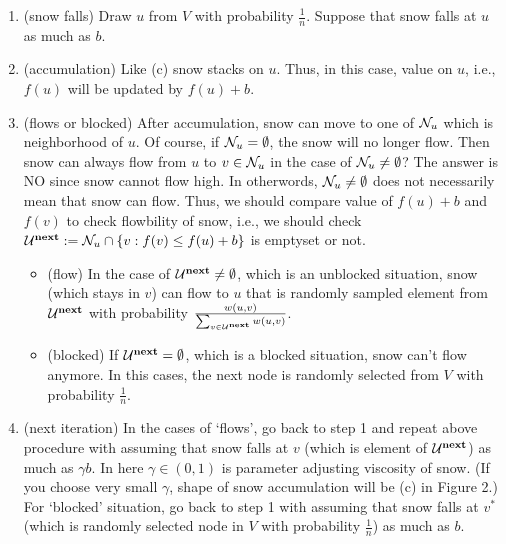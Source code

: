 \documentclass[preprint, review, 12pt]{article}
\theoremstyle{definition}
\theoremstyle{remark}
\begin{document}
\begin{enumerate}[1.]
\item (snow falls) Draw $u$ from $V$ with probability $\frac{1}{n}$. Suppose that snow falls at $u$ as much as $b$. 
\item (accumulation) Like (c) snow stacks on $u$. Thus, in this case, value on $u$, i.e., $f(u)$ will be updated by $f(u)+b$. 
\item (flows or blocked) After accumulation, snow can move to one of ${\cal N}_{u}$ which is neighborhood of $u$. Of course, if ${\cal N}_{u}=\emptyset$, the snow will no longer flow. Then snow can always flow from $u$ to $v \in {\cal N}_{u}$ in the case of ${\cal N}_{u}\neq \emptyset$? The answer is NO since snow cannot flow high. In otherwords, ${\cal N}_{u}\neq \emptyset$ does not necessarily mean that snow can flow. Thus, we should compare value of $f(u)+b$ and $f(v)$ to check flowbility of snow, i.e., we should check ${\cal U}^{\textbf{next}}:={\cal N}_{u} \cap \{v: f(v) \leq f(u)+b\}$ is emptyset or not.
\begin{itemize}
\item (flow) In the case of ${\cal U}^{\textbf{next}}\neq\emptyset$, which is an unblocked situation, snow (which stays in $v$) can flow to $u$ that is randomly sampled element from ${\cal U}^{\textbf{next}}$ with probability $\frac{w(u,v)}{\sum_{v \in {\cal U}^{\textbf{next}}}w(u,v) }$. 
\item (blocked) If ${\cal U}^{\textbf{next}}=\emptyset$, which is a blocked situation, snow can't flow anymore. In this cases, the next node is randomly selected from $V$ with probability $\frac{1}{n}$. 
\end{itemize}
\item (next iteration) In the cases of `flows', go back to step 1 and repeat above procedure with assuming that snow falls at $v$ (which is element of ${\cal U}^{\textbf{next}}$) as much as $\gamma b$. In here $\gamma \in (0,1)$ is parameter adjusting viscosity of snow. (If you choose very small $\gamma$, shape of snow accumulation will be (c) in Figure 2.) For `blocked' situation, go back to step 1 with assuming that snow falls at $v^*$ (which is randomly selected node in $V$ with probability $\frac{1}{n}$) as much as $b$.
  
\end{enumerate}
\end{document}
